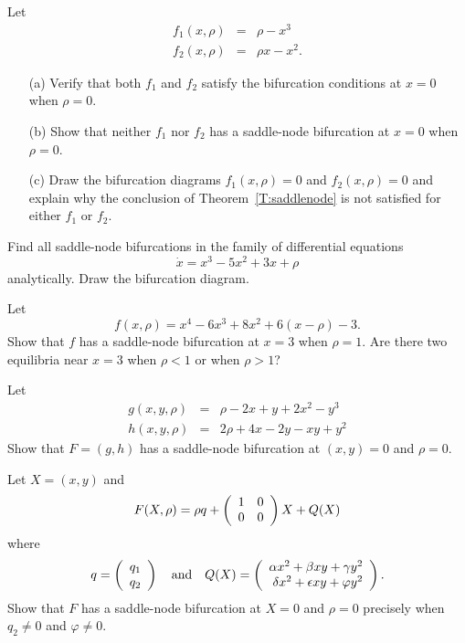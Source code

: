 \begin{exercise} \label{c9.3.1}
Let 
\begin{eqnarray*}
f_1(x,\rho) & = & \rho - x^3 \\
f_2(x,\rho) & = & \rho x - x^2.
\end{eqnarray*}
\begin{itemize}
\item[(a)] Verify that both $f_1$ and $f_2$ satisfy the bifurcation conditions 
 at $x=0$ when $\rho=0$.
\item[(b)] Show that neither $f_1$ nor $f_2$ has a saddle-node bifurcation
at $x=0$ when $\rho=0$. 
\item[(c)] Draw the bifurcation diagrams $f_1(x,\rho)=0$ and 
$f_2(x,\rho)=0$ and explain why the conclusion of 
Theorem~\ref{T:saddlenode} is not satisfied for either $f_1$ 
or $f_2$.
\end{itemize}
\end{exercise}

\begin{exercise} \label{c9.3.5}
Find all saddle-node bifurcations in the 
family of differential equations
\begin{equation}
\dot{x} = x^3 -5x^2 + 3x + \rho
\end{equation}
analytically.  Draw the bifurcation diagram.
\end{exercise}

\begin{exercise} \label{c9.3.2}
Let 
\[
f(x,\rho) = x^4 - 6x^3 +8x^2 + 6(x-\rho) - 3.
\]
Show that $f$ has a saddle-node bifurcation at $x=3$ when $\rho=1$. 
Are there two equilibria near $x=3$ when $\rho<1$ or when $\rho>1$?
\end{exercise}

\begin{exercise} \label{c9.3.3}
Let 
\begin{eqnarray*}
g(x,y,\rho) & = &  \rho - 2x +  y + 2x^2 - y^3 \\
h(x,y,\rho) & = & 2\rho + 4x - 2y -  xy  + y^2
\end{eqnarray*}
Show that $F=(g,h)$ has a saddle-node bifurcation at $(x,y)=0$ and 
$\rho=0$.
\end{exercise}


\begin{exercise} \label{c9.3.4}
Let $X=(x,y)$ and 
\[
F(X,\rho) = \rho q + \left(\begin{array}{rr} 1 & 0\\ 0 &0\end{array}\right) X + Q(X)
\]
where
\[
q=\left(\begin{array}{r} q_1 \\ q_2\end{array}\right) \quad\mbox{and}\quad Q(X) = \left(\begin{array}{r} \alpha x^2+\beta xy+\gamma y^2 \\ \delta x^2 +\epsilon xy+\varphi y^2\end{array}\right).
\]
Show that $F$ has a saddle-node bifurcation at $X=0$ and $\rho=0$ precisely 
when $q_2\neq 0$ and $\varphi\neq 0$. 
\end{exercise}



